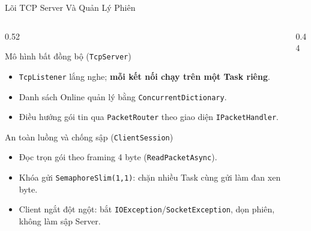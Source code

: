 \begin{frame}{Lõi TCP Server Và Quản Lý Phiên}
  \begin{columns}[T]
    \begin{column}{0.52\textwidth}
      \begin{block}{Mô hình bất đồng bộ (\texttt{TcpServer})}
        \begin{itemize}\setlength{\itemsep}{0pt}
          \item \texttt{TcpListener} lắng nghe; \textbf{mỗi kết nối chạy trên một Task riêng}.
          \item Danh sách Online quản lý bằng \texttt{Concurrent\allowbreak Dictionary}.
          \item Điều hướng gói tin qua \texttt{PacketRouter} theo giao diện \texttt{IPacketHandler}.
        \end{itemize}
      \end{block}
      \begin{alertblock}{An toàn luồng và chống sập (\texttt{ClientSession})}
        \begin{itemize}\setlength{\itemsep}{0pt}
          \item Đọc trọn gói theo framing 4 byte (\texttt{ReadPacketAsync}).
          \item Khóa gửi \texttt{SemaphoreSlim(1,1)}: chặn nhiều Task cùng gửi làm đan xen byte.
          \item Client ngắt đột ngột: bắt \texttt{IOException}/\texttt{SocketException}, dọn phiên, không làm sập Server.
        \end{itemize}
      \end{alertblock}
    \end{column}
    \begin{column}{0.44\textwidth}
      \centering
    \end{column}
  \end{columns}
\end{frame}

